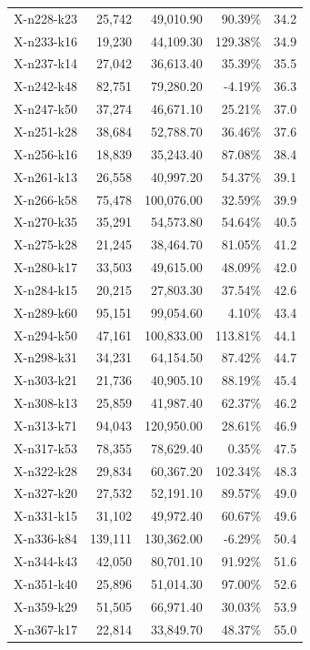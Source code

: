\documentclass[12pt,a4paper]{article}
\begin{document}
\begin{longtable}{@{}lrrrr@{}}
    X-n228-k23 & 25,742 & 49,010.90 & 90.39\% & 34.2 \\
    X-n233-k16 & 19,230 & 44,109.30 & 129.38\% & 34.9 \\
    X-n237-k14 & 27,042 & 36,613.40 & 35.39\% & 35.5 \\
    X-n242-k48 & 82,751 & 79,280.20 & -4.19\% & 36.3 \\
    X-n247-k50 & 37,274 & 46,671.10 & 25.21\% & 37.0 \\
    X-n251-k28 & 38,684 & 52,788.70 & 36.46\% & 37.6 \\
    X-n256-k16 & 18,839 & 35,243.40 & 87.08\% & 38.4 \\
    X-n261-k13 & 26,558 & 40,997.20 & 54.37\% & 39.1 \\
    X-n266-k58 & 75,478 & 100,076.00 & 32.59\% & 39.9 \\
    X-n270-k35 & 35,291 & 54,573.80 & 54.64\% & 40.5 \\
    X-n275-k28 & 21,245 & 38,464.70 & 81.05\% & 41.2 \\
    X-n280-k17 & 33,503 & 49,615.00 & 48.09\% & 42.0 \\
    X-n284-k15 & 20,215 & 27,803.30 & 37.54\% & 42.6 \\
    X-n289-k60 & 95,151 & 99,054.60 & 4.10\% & 43.4 \\
    X-n294-k50 & 47,161 & 100,833.00 & 113.81\% & 44.1 \\
    X-n298-k31 & 34,231 & 64,154.50 & 87.42\% & 44.7 \\
    X-n303-k21 & 21,736 & 40,905.10 & 88.19\% & 45.4 \\
    X-n308-k13 & 25,859 & 41,987.40 & 62.37\% & 46.2 \\
    X-n313-k71 & 94,043 & 120,950.00 & 28.61\% & 46.9 \\
    X-n317-k53 & 78,355 & 78,629.40 & 0.35\% & 47.5 \\
    X-n322-k28 & 29,834 & 60,367.20 & 102.34\% & 48.3 \\
    X-n327-k20 & 27,532 & 52,191.10 & 89.57\% & 49.0 \\
    X-n331-k15 & 31,102 & 49,972.40 & 60.67\% & 49.6 \\
    X-n336-k84 & 139,111 & 130,362.00 & -6.29\% & 50.4 \\
    X-n344-k43 & 42,050 & 80,701.10 & 91.92\% & 51.6 \\
    X-n351-k40 & 25,896 & 51,014.30 & 97.00\% & 52.6 \\
    X-n359-k29 & 51,505 & 66,971.40 & 30.03\% & 53.9 \\
    X-n367-k17 & 22,814 & 33,849.70 & 48.37\% & 55.0 \\

\end{longtable}
\end{document}
